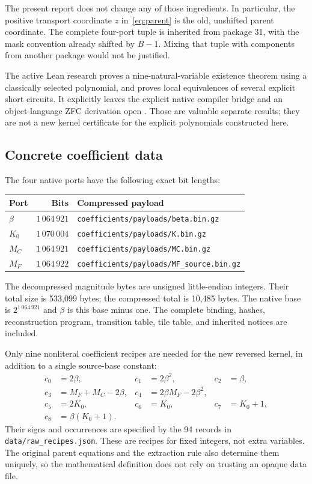 \documentclass[11pt,letterpaper]{article}
\theoremstyle{definition}\newtheorem{definition}[theorem]{Definition}
\newcommand{\file}[1]{{\small\nolinkurl{#1}}}
\begin{document}
The present report does not change any of those ingredients. In particular,
the positive transport coordinate $z$ in~\eqref{eq:parent} is the old,
unshifted parent coordinate. The complete four-port tuple is inherited from
package 31, with the mask convention already shifted by $B-1$.
Mixing that tuple with components from another package would not be justified.

The active Lean research proves a nine-natural-variable existence theorem
using a classically selected polynomial, and proves local equivalences of
several explicit short circuits. It explicitly leaves the explicit native
compiler bridge and an object-language ZFC derivation open
\cite{active}. Those are valuable separate results; they are not a new
kernel certificate for the explicit polynomials constructed here.

\subsection{Concrete coefficient data}
The four native ports have the following exact bit lengths:
\begin{center}
\begin{tabular}{lrl}
\toprule
Port & Bits & Compressed payload\\
\midrule
$\beta$ & $1\,064\,921$ & \file{coefficients/payloads/beta.bin.gz}\\
$K_0$ & $1\,070\,004$ & \file{coefficients/payloads/K.bin.gz}\\
$M_C$ & $1\,064\,921$ & \file{coefficients/payloads/MC.bin.gz}\\
$M_F$ & $1\,064\,922$ & \file{coefficients/payloads/MF_source.bin.gz}\\
\bottomrule
\end{tabular}
\end{center}
The decompressed magnitude bytes are unsigned little-endian integers.
Their total size is 533,099 bytes; the compressed total is 10,485 bytes.
The native base is $2^{1\,064\,921}$ and $\beta$ is this base minus one.
The complete binding, hashes, reconstruction program, transition table,
tile table, and inherited notices are included.

Only nine nonliteral coefficient recipes are needed for the new reversed
kernel, in addition to a single source-base constant:
\begin{align*}
c_0&=2\beta,& c_1&=2\beta^2,& c_2&=\beta,\\
c_3&=M_F+M_C-2\beta,& c_4&=2\beta M_F-2\beta^2,\\
c_5&=2K_0,& c_6&=K_0,& c_7&=K_0+1,\\
c_8&=\beta(K_0+1).&&&
\end{align*}
Their signs and occurrences are specified by the 94 records in
\file{data/raw_recipes.json}. These are recipes for fixed integers, not
extra variables. The original parent equations and the extraction rule
also determine them uniquely, so the mathematical definition does not rely
on trusting an opaque data file.
\end{document}
